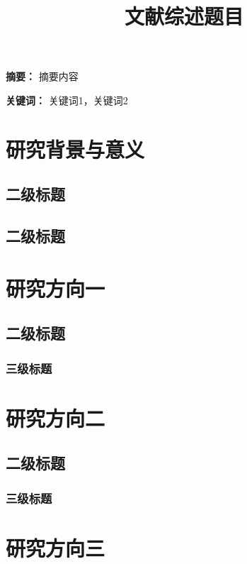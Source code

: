 \documentclass[a4paper,11pt,hyperref]{ctexart}
\title{\vspace{-5ex}\textbf{文献综述题目}\vspace{-5ex}}
\date{}
\begin{document}
\maketitle

\noindent\textbf{摘要：} 摘要内容

\noindent\textbf{关键词：} 关键词1，关键词2

\section{研究背景与意义}

\subsection{二级标题}

\subsection{二级标题}

\section{研究方向一}

\subsection{二级标题}

\subsubsection{三级标题}

\section{研究方向二}

\subsection{二级标题}

\subsubsection{三级标题}

\section{研究方向三}
\end{document}
